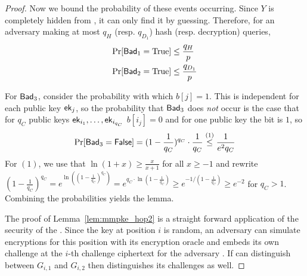 \begin{proof}
  Now we bound the probability of these events occurring. Since $Y$ is completely hidden from \Adv, it can only find it by
  guessing. Therefore, for an adversary \Adv making at most $q_H$ (resp. $q_{D_1}$) hash (resp. decryption) queries,
  \begin{align*}
    \Pr[{\mathsf{Bad}}_1 = \text{True}] &\leq \frac{q_{H}}{p} \\
    \Pr[{\mathsf{Bad}}_2 = \text{True}] &\leq \frac{q_{D_1}}{p}
  \end{align*}

  For ${\mathsf{Bad}}_3$, consider the probability with which $b[j] = 1$. This is independent for each public key
  ${\mathsf{ek}}_j$, so the probability that ${\mathsf{Bad}}_3$ does \emph{not} occur is the case that for $q_C$ public keys
  ${\mathsf{ek}}_{i_1},\ldots,{\mathsf{ek}}_{i_{q_C}}$ $b[i_j] = 0$ and for one public key the bit is $1$, so
  \[
    \Pr[{\mathsf{Bad}}_3 = {\mathsf{False}}] = (1-\frac{1}{q_C})^{q_C}\cdot \frac{1}{q_C} \overset{(1)}{\leq} \frac{1}{e^2q_C}
  \]
  For $(1)$, we use that $\ln(1+x) \geq \frac{x}{x+1}$ for all $x \geq -1$ and rewrite $(1-\frac{1}{q_C})^{q_C} =
  e^{\ln((1-\frac{1}{q_C})^{q_C})} = e^{q_C\cdot\ln(1-\frac{1}{q_C})} \geq e^{-1/(1-\frac{1}{q_C})} \geq e^{-2}$ for
  $q_C > 1$.
  Combining the probabilities yields the lemma.

  The proof of Lemma~\ref{lem:mmpke_hop2} is a straight forward application of the \indrcca security of the \dem. Since the
  key at position $i$ is random, an \indrcca adversary can simulate encryptions for this position with its encryption
  oracle and embeds its own challenge at the $i$-th challenge ciphertext for the adversary \Adv. If \Adv can distinguish
  between $G_{i,1}$ and $G_{i,2}$ then \Bdv[2] distinguishes its challenges as well.
\end{proof}





